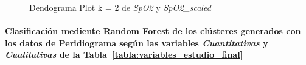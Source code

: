 \begin{figure}[ht]
    \centering
    \hfill
    \caption{Dendograma Plot k = 2 de \textit{SpO2} y \textit{SpO2\_scaled}}\label{fig:acf_ctg_spo2}
\end{figure}

\paragraph{Clasificación mediente Random Forest de los clústeres generados con los datos de Peridiograma según las variables \textit{Cuantitativas} y \textit{Cualitativas} de la Tabla~\ref{tabla:variables_estudio_final}}

